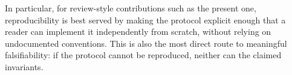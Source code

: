 In particular, for review-style contributions such as the present one, reproducibility is best served by making the protocol explicit enough that a reader can implement it independently from scratch, without relying on undocumented conventions. This is also the most direct route to meaningful falsifiability: if the protocol cannot be reproduced, neither can the claimed invariants.

